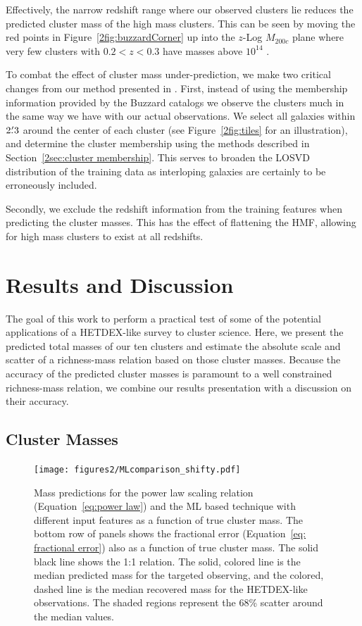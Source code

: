 Effectively, the narrow redshift range where our observed clusters lie reduces the predicted cluster mass of the high mass clusters. This can be seen by moving the red points in Figure~\ref{2fig:buzzardCorner} up into the $z$-Log $M_{200c}$ plane where very few clusters with $0.2< z <0.3$ have masses above $10^{14}$ \Msol.

To combat the effect of cluster mass under-prediction, we make two critical changes from our method presented in . First, instead of using the membership information provided by the Buzzard catalogs we observe the clusters much in the same way we have with our actual observations. We select all galaxies within $2\mbox{\ensuremath{.\mkern-4mu^\prime}}3$ around the center of each cluster (see Figure~\ref{2fig:tiles} for an illustration), and determine the cluster membership using the methods described in Section~\ref{2sec:cluster membership}. This serves to broaden the LOSVD distribution of the training data as interloping galaxies are certainly to be erroneously included.

Secondly, we exclude the redshift information from the training features when predicting the cluster masses. This has the effect of flattening the HMF, allowing for high mass clusters to exist at all redshifts. 

\section{Results and Discussion}\label{2sec:results}
The goal of this work to perform a practical test of some of the potential applications of a HETDEX-like survey to cluster science. Here, we present the predicted total masses of our ten clusters and estimate the absolute scale and scatter of a richness-mass relation based on those cluster masses. Because the accuracy of the predicted cluster masses is paramount to a well constrained richness-mass relation, we combine our results presentation with a discussion on their accuracy. 
 
\subsection{Cluster Masses}
\begin{figure}
	\centering 
	\texttt{[image: figures2/MLcomparison\_shifty.pdf]}
	\caption[ML based cluster mass predictions]{Mass predictions for the power law scaling relation (Equation~\ref{eq:power law}) and the ML based technique with different input features as a function of true cluster mass. The bottom row of panels shows the fractional error (Equation~\ref{eq: fractional error}) also as a function of true cluster mass. The solid black line shows the 1:1 relation. The solid, colored line is the median predicted mass for the targeted observing, and the colored, dashed line is the median recovered mass for the HETDEX-like observations. The shaded regions represent the 68\% scatter around the median values.} \label{2fig: ML comparison} 
\end{figure}

